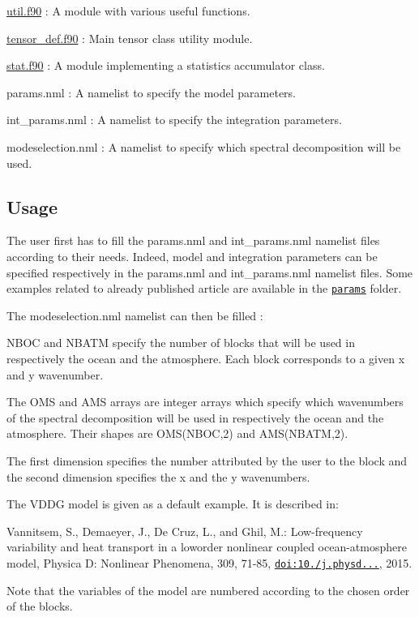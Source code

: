 \begin{DoxyItemize}
\item \hyperlink{util_8f90_source}{util.\+f90} \+: A module with various useful functions.
\item \hyperlink{tensor__def_8f90_source}{tensor\+\_\+def.\+f90} \+: Main tensor class utility module.
\item \hyperlink{stat_8f90_source}{stat.\+f90} \+: A module implementing a statistics accumulator class.
\item params.\+nml \+: A namelist to specify the model parameters.
\item int\+\_\+params.\+nml \+: A namelist to specify the integration parameters.
\item modeselection.\+nml \+: A namelist to specify which spectral decomposition will be used.
\end{DoxyItemize}





\subsection*{Usage}

The user first has to fill the params.\+nml and int\+\_\+params.\+nml namelist files according to their needs. Indeed, model and integration parameters can be specified respectively in the params.\+nml and int\+\_\+params.\+nml namelist files. Some examples related to already published article are available in the \href{../../params/}{\tt params} folder.

The modeselection.\+nml namelist can then be filled \+:
\begin{DoxyItemize}
\item N\+B\+OC and N\+B\+A\+TM specify the number of blocks that will be used in respectively the ocean and the atmosphere. Each block corresponds to a given x and y wavenumber.
\item The O\+MS and A\+MS arrays are integer arrays which specify which wavenumbers of the spectral decomposition will be used in respectively the ocean and the atmosphere. Their shapes are O\+M\+S(\+N\+B\+O\+C,2) and A\+M\+S(\+N\+B\+A\+T\+M,2).
\item The first dimension specifies the number attributed by the user to the block and the second dimension specifies the x and the y wavenumbers.
\item The V\+D\+DG model is given as a default example. It is described in\+:
\begin{DoxyItemize}
\item Vannitsem, S., Demaeyer, J., De Cruz, L., and Ghil, M.\+: Low-\/frequency variability and heat transport in a loworder nonlinear coupled ocean-\/atmosphere model, Physica D\+: Nonlinear Phenomena, 309, 71-\/85, \href{https://doi.org/10.1016/j.physd.2015.07.006}{\tt doi\+:10./j.physd...}, 2015.
\end{DoxyItemize}
\item Note that the variables of the model are numbered according to the chosen order of the blocks.
\end{DoxyItemize}

